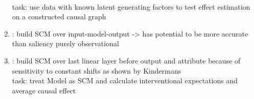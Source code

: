 \begin{enumerate}
            \\ task: use data with known latent generating factors to test effect estimation on a constructed causal graph
      \item \cite{Narendra2018}: build SCM over input-model-output -> has potential to be more accurate than saliency purely observational
      \item \cite{Chattopadhyay2019}: build SCM over last linear layer before output and attribute because of sensitivity to constant shifts as shown by Kindermans
            \\ task: treat Model as SCM and calculate interventional expectations and average causal effect
\end{enumerate}

